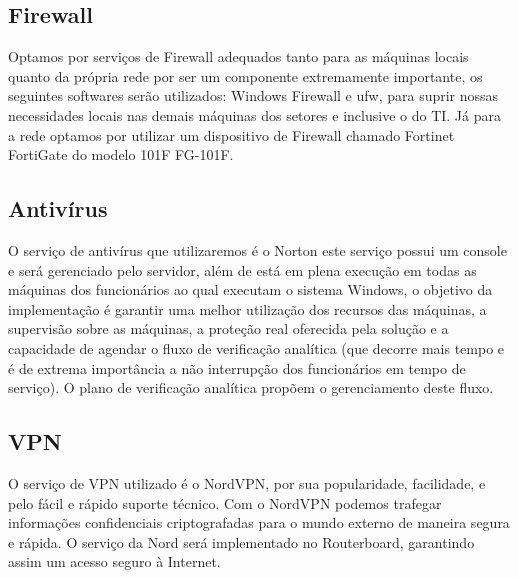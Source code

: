 \documentclass[12pt]{article}
\begin{document}
\subsection{Firewall}
Optamos por serviços de Firewall adequados tanto para as máquinas locais quanto da própria rede por ser um componente extremamente importante, os seguintes softwares serão utilizados: Windows Firewall e ufw, para suprir nossas necessidades locais nas demais máquinas dos setores e inclusive o do TI. Já para a rede optamos por utilizar um dispositivo de Firewall chamado Fortinet FortiGate do modelo 101F FG-101F.
\subsection{Antivírus}
O serviço de antivírus que utilizaremos é o Norton este serviço possui um console e será gerenciado pelo servidor, além de está em plena execução em todas as máquinas dos funcionários ao qual executam o sistema Windows, o objetivo da implementação é garantir uma melhor utilização dos recursos das máquinas, a supervisão sobre as máquinas, a proteção real oferecida pela solução e a capacidade de agendar o fluxo de verificação analítica (que decorre mais tempo e é de extrema importância a não interrupção dos funcionários em tempo de serviço). O plano de verificação analítica propõem o gerenciamento deste fluxo.
\subsection{VPN}
O serviço de VPN utilizado é o NordVPN, por sua popularidade, facilidade, e pelo fácil e rápido suporte técnico. Com o NordVPN podemos trafegar informações confidenciais criptografadas para o mundo externo de maneira segura e rápida. O serviço da Nord será implementado no Routerboard, garantindo assim um acesso seguro à Internet.
\end{document}
